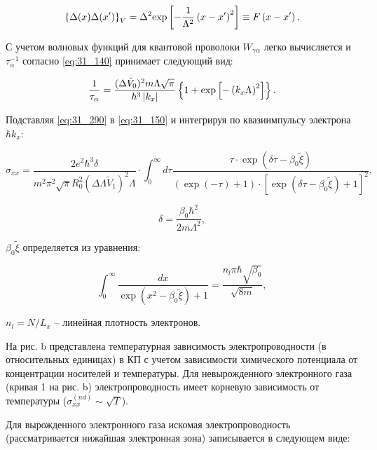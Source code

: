 \begin{equation} \label{eq:31_280}
\left\{\Delta (x)\Delta (x')\right\}_{V} =\Delta ^{2} {\rm exp}\left[-\frac{1}{\Lambda ^{2} } \left(x-x'\right)^{2} \right]\equiv F\left(x-x'\right).
\end{equation}

С учетом волновых функций для квантовой проволоки \cite{Constantinou1989} $W_{\gamma \alpha } $ легко вычисляется и $\tau _{\alpha }^{-1} $ согласно \eqref{eq:31_140} принимает следующий вид:

\begin{equation} \label{eq:31_290}
\frac{1}{\tau _{\alpha } } =\frac{(\Delta \tilde{V}_{0} )^{2} m\Lambda \sqrt{\pi } }{\hbar ^{3} \left|k_{x} \right|} \left\{{\rm 1}+{\rm exp}\left[{\rm -}\left(k_{x} \Lambda \right)^{2} \right]\right\}.
\end{equation}

Подставляя \eqref{eq:31_290} в \eqref{eq:31_150} и интегрируя по квазиимпульсу электрона $\hbar k_{x} $:

\begin{equation} \label{eq:31_300}
\sigma _{xx} =\frac{2e^{2} \hbar ^{3} \delta }{m^{2} \pi ^{2} \sqrt{\pi } R_{0}^{2} \left(\Delta \Lambda \tilde{V}_{1} \right)^{2} \Lambda } \cdot \int _{0}^{\infty }d\tau \frac{\tau \cdot {\exp}\left(\delta \tau -\beta _{0} \tilde{\xi }\right)}{\left(\exp(-\tau )+1\right)\cdot \left[{\exp}\left(\delta \tau -\beta _{0} \tilde{\xi }\right)+1\right]^{2} },
\end{equation}

$$\delta =\frac{\beta _{0} \hbar ^{2} }{2m\Lambda ^{2} },$$

\noindent $\beta _{0} \tilde{\xi }$ определяется из уравнения:

\[
\int _{0}^{\infty }\frac{dx}{\exp \left(x^{2} -\beta _{0} \tilde{\xi }\right)+1} =\frac{n_{l} \pi \hbar \sqrt{\beta _{0} } }{\sqrt{8m} },
\]

\noindent $n_{l} =N/L_{x} $ -- линейная плотность электронов.

На рис. b представлена температурная зависимость электропроводности (в относительных единицах) в КП с учетом зависимости химического потенциала от концентрации носителей и температуры. Для невырожденного электронного газа (кривая 1 на рис. b) электропроводность имеет корневую зависимость от температуры ($\sigma _{xx}^{(nd)} \sim \sqrt{T} $).

Для вырожденного электронного газа искомая электропроводность (рассматривается нижайшая электронная зона) записывается в следующем виде:

